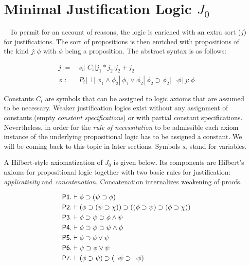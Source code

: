 \section{Minimal Justification Logic $J_0$}~\label{min:jo}
To permit for an account of reasons, the logic is enriched with an extra sort ($j$) for justifications. The sort of propositions is then enriched with propositions of the kind $j:\phi$ with $\phi$ being a proposition. 
The abstract syntax is as follows:

\begin{mdframed}
\begin{align*}
j := &s_i|\ C_i| j_1*j_2| j_2 + j_2\\
 \phi:=& P_i|\ \bot|\ \phi_1\wedge\phi_2|\ \phi_1\vee\phi_2| \ \phi_2\supset\phi_2|\ \neg\phi|\ j:\phi   
\end{align*}
\end{mdframed}
Constants $C_i$ are symbols that can be assigned to logic axioms that are assumed to be necessary. Weaker justification logics exist without any assignment of constants (empty \emph{constant specifications}) or with partial constant specifications. Nevertheless, in order for the  \emph{rule of necessitation} to be admissible each axiom instance of the underlying propositional logic has to be assigned a constant. We will be coming back to this topic in later sections. Symbols $s_i$ stand for variables.

A Hilbert-style axiomatization of $J_0$ is given below. Its components are Hilbert's axioms for propositional logic together with two basic rules for justification: \emph{applicativity} and \emph{concatenation}. 
Concatenation internalizes weakening of proofs.
\begin{mdframed}
\begin{align*}
&\sf{P1}.  \vdash \phi\supset(\psi\supset\phi)\\
& \sf{P2}. \vdash (\phi\supset(\psi\supset\chi))\supset((\phi\supset\psi)\supset(\phi\supset\chi))\\
& \sf{P3}. \vdash \phi\supset\psi\supset\phi\wedge\psi\\
&\sf{P4}. \vdash \phi\supset\psi\supset\psi\wedge\phi\\
&\sf{P5}.  \vdash \phi\supset\phi\vee\psi\\
&\sf{P6}. \vdash \psi\supset\phi\vee\psi\\
&\sf{P7}. \vdash (\phi\supset\psi)\supset(\neg\psi\supset\neg\phi)\\
\end{align*}
\end{mdframed}


